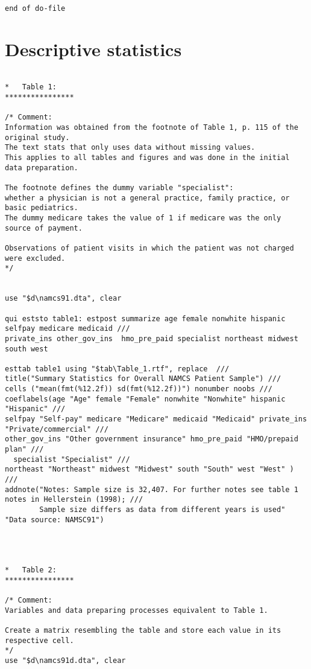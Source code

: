 \documentclass[
]{book}
\begin{document}
\begin{verbatim}
end of do-file
\end{verbatim}

\hypertarget{A2}{%
\section{Descriptive statistics}\label{A2}}

\begin{verbatim}

*   Table 1:
****************

/* Comment:
Information was obtained from the footnote of Table 1, p. 115 of the original study.
The text stats that only uses data without missing values.
This applies to all tables and figures and was done in the initial data preparation.

The footnote defines the dummy variable "specialist":
whether a physician is not a general practice, family practice, or basic pediatrics.
The dummy medicare takes the value of 1 if medicare was the only source of payment.

Observations of patient visits in which the patient was not charged were excluded.
*/
  
  
use "$d\namcs91.dta", clear

qui eststo table1: estpost summarize age female nonwhite hispanic selfpay medicare medicaid ///
private_ins other_gov_ins  hmo_pre_paid specialist northeast midwest south west

esttab table1 using "$tab\Table_1.rtf", replace  ///
title("Summary Statistics for Overall NAMCS Patient Sample") ///
cells ("mean(fmt(%12.2f)) sd(fmt(%12.2f))") nonumber noobs ///
coeflabels(age "Age" female "Female" nonwhite "Nonwhite" hispanic "Hispanic" ///
selfpay "Self-pay" medicare "Medicare" medicaid "Medicaid" private_ins "Private/commercial" ///
other_gov_ins "Other government insurance" hmo_pre_paid "HMO/prepaid plan" ///
  specialist "Specialist" ///
northeast "Northeast" midwest "Midwest" south "South" west "West" ) ///
addnote("Notes: Sample size is 32,407. For further notes see table 1 notes in Hellerstein (1998); ///
        Sample size differs as data from different years is used" "Data source: NAMSC91")




*   Table 2:
****************

/* Comment:
Variables and data preparing processes equivalent to Table 1.

Create a matrix resembling the table and store each value in its respective cell.
*/
use "$d\namcs91d.dta", clear



\end{verbatim}
\end{document}

